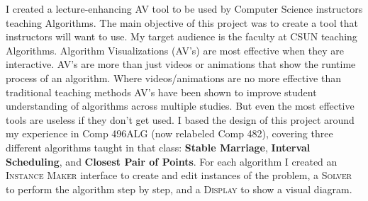 \hspace{-0.3in}
I created a lecture-enhancing AV tool 
to be used by Computer Science instructors teaching Algorithms.
The main objective of this project was 
to create a tool that instructors will want to use. 
My target audience is the faculty at CSUN teaching Algorithms. 
\newline\newline
Algorithm Visualizations (AV's) are most effective when they are interactive. 
AV's are more than just videos or animations that show the runtime process of an algorithm. Where videos/animations are no more effective than traditional teaching methods 
AV's have been shown to improve student understanding of algorithms across multiple studies. 
But even the most effective tools are useless if they don't get used. 
\newline\newline
I based the design of this project around my experience 
in Comp 496ALG (now relabeled Comp 482),
covering three different algorithms taught in that class: \textbf{Stable Marriage}, \textbf{Interval
Scheduling}, and \textbf{Closest Pair of Points}. 
For each algorithm I created 
an \textsc{Instance Maker} interface to create and edit instances of the problem, 
a \textsc{Solver} to perform the algorithm step by step,
and a \textsc{Display} to show a visual diagram.
